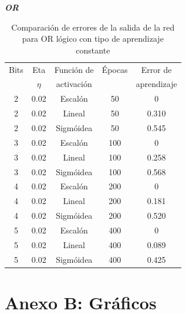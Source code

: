 \documentclass[%
    final,
    reprint,
    notitlepage,
    narroweqnarray,
    inline,
    twoside,
    invited
    ]{ieee}
\begin{document}
\begin{center}
\textbf{\emph{OR}}
\end{center}

\begin{table}[H]
\begin{center}
\begin{tabular}{|c|c|c|c|c|}
\hline
Bits &  Eta & Función de &  Épocas & Error de\\
 & $\eta$ & activación &  & aprendizaje\\

\hline
\hline

2 & 0.02 & Escalón & 50 & 0\\
\hline
2 & 0.02 & Lineal & 50 & 0.310\\
\hline
2 & 0.02 & Sigmóidea & 50 & 0.545\\
\hline
\hline
3 & 0.02 & Escalón & 100 & 0\\
\hline
3 & 0.02 & Lineal & 100 & 0.258\\
\hline
3 & 0.02 & Sigmóidea & 100 & 0.568\\
\hline
\hline
4 & 0.02 & Escalón & 200 & 0\\
\hline
4 & 0.02 & Lineal & 200 & 0.181\\
\hline
4 & 0.02 & Sigmóidea & 200 & 0.520\\
\hline
\hline
5 & 0.02 & Escalón & 400 & 0\\
\hline
5 & 0.02 & Lineal & 400 & 0.089\\
\hline
5 & 0.02 & Sigmóidea & 400 & 0.425\\
\hline

\end{tabular}
\end{center}
\caption{Comparación de errores de la salida de la red para OR lógico con tipo de aprendizaje constante}\label{tablaIDFS}
\end{table}

\clearpage

\section*{Anexo B: Gráficos}
\end{document}
